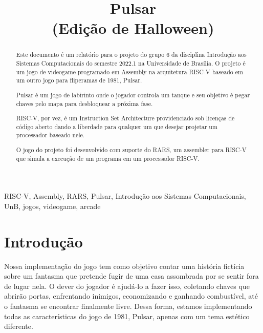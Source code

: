\documentclass[conference]{IEEEtran}
\begin{document}
\title{Pulsar\\
(Edição de Halloween)}

\author{
\and
{}
\and
{}
}

\maketitle

\begin{abstract}
Este documento é um relatório para o projeto do grupo 6 da disciplina Introdução aos Sistemas Computacionais do semestre 2022.1 na Universidade de Brasília. O projeto é um jogo de videogame programado em Assembly na arquitetura RISC-V baseado em um outro jogo para fliperamas de 1981, Pulsar. 

Pulsar é um jogo de labirinto onde o jogador controla um tanque e seu objetivo é pegar chaves pelo mapa para desbloquear a próxima fase.\textsuperscript{\cite{b1}}

RISC-V, por vez, é um Instruction Set Architecture providenciado sob licenças de código aberto dando a liberdade para qualquer um que desejar projetar um processador baseado nele.
\textsuperscript{\cite{b2}}

O jogo do projeto foi desenvolvido com suporte do RARS, um assembler para RISC-V que simula a execução de um programa em um processador RISC-V.
\end{abstract}

\begin{IEEEkeywords}
RISC-V, Assembly, RARS, Pulsar, Introdução aos Sistemas Computacionais, UnB, jogos, videogame, arcade
\end{IEEEkeywords}

\section{Introdução}
Nossa implementação do jogo tem como objetivo contar uma história fictícia sobre um fantasma que pretende fugir de uma casa assombrada por se sentir fora de lugar nela. O dever do jogador é ajudá-lo a fazer isso, coletando chaves que abrirão portas, enfrentando inimigos, economizando e ganhando combustível, até o fantasma se encontrar finalmente livre. Dessa forma, estamos implementando todas as características do jogo de 1981, Pulsar, apenas com um tema estético diferente. 
\end{document}

